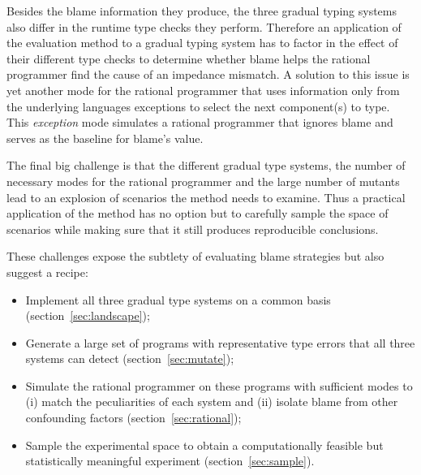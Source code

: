 
Besides the blame information they produce, the three gradual typing
systems also differ in the runtime type checks they perform. Therefore an
application of the evaluation method to a gradual typing system has to
factor in the effect of their different type checks to determine whether blame helps the
rational programmer find the cause of an impedance mismatch. A solution to this issue
is yet another mode for the rational programmer that uses information only
from the underlying languages exceptions to select the next component(s) to type.
This \emph{exception} mode simulates a rational programmer that ignores
blame and serves as the baseline for blame's value.


The final big challenge is that the different gradual type
systems, the number of necessary modes for the rational programmer
and the large number of mutants lead to an explosion of scenarios the
method needs to examine. Thus a practical application of the
method has no option but to carefully sample the space of scenarios while 
making sure that it still produces reproducible conclusions.


\smallskip

These challenges expose the subtlety of evaluating blame strategies but
also suggest a recipe:


\begin{itemize}

\item Implement all three gradual type systems on a common
  basis (section~\ref{sec:landscape});

\item Generate a large set of programs with representative
  type errors that all three systems can detect (section~\ref{sec:mutate}); 
    
\item Simulate the rational programmer on these programs with sufficient 
  modes to (i) match the peculiarities of each  system and 
    (ii) isolate blame from other confounding factors
    (section~\ref{sec:rational});



\item Sample the experimental space  to obtain a computationally feasible
  but statistically meaningful experiment (section~\ref{sec:sample}).

\end{itemize}
